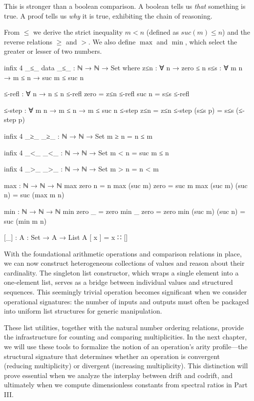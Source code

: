 \documentclass[11pt,a4paper]{book}
\def\mathrm#1{#1}%
\begin{document}
This is stronger than a boolean comparison. A boolean tells us \emph{that} something 
is true. A proof tells us \emph{why} it is true, exhibiting the chain of reasoning.

From $\le$ we derive the strict inequality $m < n$ (defined as $\mathrm{suc}(m) \le n$) 
and the reverse relations $\ge$ and $>$. We also define $\max$ and $\min$, which select 
the greater or lesser of two numbers.

\begin{code}
infix 4 _≤_
data _≤_ : ℕ → ℕ → Set where
  z≤n : ∀ {n} → zero ≤ n
  s≤s : ∀ {m n} → m ≤ n → suc m ≤ suc n

≤-refl : ∀ {n} → n ≤ n
≤-refl {zero}  = z≤n
≤-refl {suc n} = s≤s ≤-refl

≤-step : ∀ {m n} → m ≤ n → m ≤ suc n
≤-step z≤n = z≤n
≤-step (s≤s p) = s≤s (≤-step p)

infix 4 _≥_
_≥_ : ℕ → ℕ → Set
m ≥ n = n ≤ m

infix 4 _<_
_<_ : ℕ → ℕ → Set
m < n = suc m ≤ n

infix 4 _>_
_>_ : ℕ → ℕ → Set
m > n = n < m

max : ℕ → ℕ → ℕ
max zero  n     = n
max (suc m) zero  = suc m
max (suc m) (suc n) = suc (max m n)

min : ℕ → ℕ → ℕ
min zero  _     = zero
min _     zero  = zero
min (suc m) (suc n) = suc (min m n)

[_] : {A : Set} → A → List A
[ x ] = x ∷ []
\end{code}

With the foundational arithmetic operations and comparison relations in place, we can now construct heterogeneous collections of values and reason about their cardinality. The singleton list constructor, which wraps a single element into a one-element list, serves as a bridge between individual values and structured sequences. This seemingly trivial operation becomes significant when we consider operational signatures: the number of inputs and outputs must often be packaged into uniform list structures for generic manipulation.

These list utilities, together with the natural number ordering relations, provide the infrastructure for counting and comparing multiplicities. In the next chapter, we will use these tools to formalize the notion of an operation's arity profile—the structural signature that determines whether an operation is convergent (reducing multiplicity) or divergent (increasing multiplicity). This distinction will prove essential when we analyze the interplay between drift and codrift, and ultimately when we compute dimensionless constants from spectral ratios in Part III.
\end{document}
